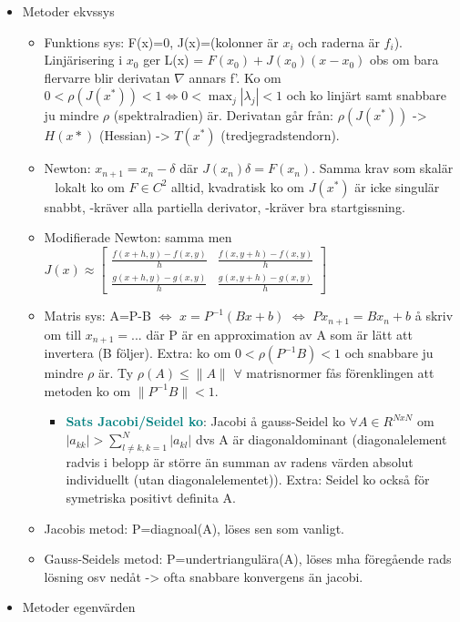 \documentclass[a4paper]{article}
\begin{document}
\begin{itemize}
    \item Metoder ekvssys
    \begin{itemize}
        \item Funktions sys: F(x)=0, J(x)=(kolonner är $x_i$ och raderna är $f_i$). Linjärisering i $x_0$ ger L(x) = $F(x_0)+J(x_0)(x-x_0)$ obs om bara flervarre blir derivatan $\nabla$ annars f'. Ko om $0<\rho(J(x^*))<1 \Longleftrightarrow  0<\max_j |\lambda_j|<1$ och ko linjärt samt snabbare ju mindre $\rho$ (spektralradien) är. Derivatan går från: $\rho(J(x^*))$ -> $H(x*)$ (Hessian) -> $T(x^*)$ (tredjegradstendorn).
        \item Newton: $x_{n+1} = x_n - \delta$ där $J(x_n)\delta = F(x_n)$. Samma krav som skalär ~ lokalt ko om $F\in C^2$ alltid, kvadratisk ko om $J(x^*)$ är icke singulär snabbt, -kräver alla partiella derivator, -kräver bra startgissning.
        \item Modifierade Newton: samma men $J(x)\approx \begin{bmatrix} \frac{f(x+h, y)-f(x, y)}{h} & \frac{f(x, y+h)-f(x, y)}{h} \\ \frac{g(x+h, y)-g(x, y)}{h} & \frac{g(x, y+h)-g(x, y)}{h} \end{bmatrix}$
        \item Matris sys: A=P-B $\Leftrightarrow$ $x=P^{-1}(Bx+b)$ $\Leftrightarrow$ $Px_{n+1}=Bx_n+b$ å skriv om till $x_{n+1}=...$ där P är en approximation av A som är lätt att invertera (B följer). Extra: ko om $0<\rho(P^{-1}B)<1$ och snabbare ju mindre $\rho$ är. Ty $\rho(A)\leq \|A\|$ $\forall$ matrisnormer fås förenklingen att metoden ko om $\|P^{-1}B\|<1$. 
        \begin{itemize}
            \item \textcolor{teal}{\textbf{Sats Jacobi/Seidel ko}}: Jacobi å gauss-Seidel ko $\forall A\in R^{NxN}$ om $|a_{kk}|>\sum_{l\neq k, k=1}^{N} |a_{kl}|$ dvs A är diagonaldominant (diagonalelement radvis i belopp är större än summan av radens värden absolut individuellt (utan diagonalelementet)). Extra: Seidel ko också för symetriska positivt definita A.
        \end{itemize}
        \item Jacobis metod: P=diagnoal(A), löses sen som vanligt.
        \item Gauss-Seidels metod: P=undertriangulära(A), löses mha föregående rads lösning osv nedåt -> ofta snabbare konvergens än jacobi.
    \end{itemize}
    \item Metoder egenvärden
        \begin{itemize}

\end{itemize}
\end{itemize}
\end{document}
